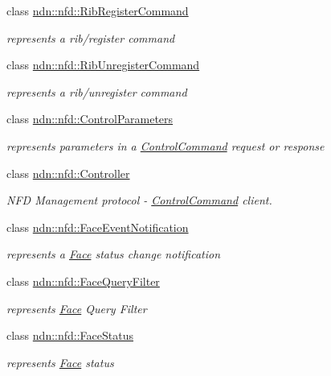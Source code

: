 \begin{DoxyCompactItemize}
class \hyperlink{classndn_1_1nfd_1_1RibRegisterCommand}{ndn\+::nfd\+::\+Rib\+Register\+Command}
\begin{DoxyCompactList}\small\item\em represents a rib/register command \end{DoxyCompactList}\item 
class \hyperlink{classndn_1_1nfd_1_1RibUnregisterCommand}{ndn\+::nfd\+::\+Rib\+Unregister\+Command}
\begin{DoxyCompactList}\small\item\em represents a rib/unregister command \end{DoxyCompactList}\item 
class \hyperlink{classndn_1_1nfd_1_1ControlParameters}{ndn\+::nfd\+::\+Control\+Parameters}
\begin{DoxyCompactList}\small\item\em represents parameters in a \hyperlink{classndn_1_1nfd_1_1ControlCommand}{Control\+Command} request or response \end{DoxyCompactList}\item 
class \hyperlink{classndn_1_1nfd_1_1Controller}{ndn\+::nfd\+::\+Controller}
\begin{DoxyCompactList}\small\item\em N\+FD Management protocol -\/ \hyperlink{classndn_1_1nfd_1_1ControlCommand}{Control\+Command} client. \end{DoxyCompactList}\item 
class \hyperlink{classndn_1_1nfd_1_1FaceEventNotification}{ndn\+::nfd\+::\+Face\+Event\+Notification}
\begin{DoxyCompactList}\small\item\em represents a \hyperlink{classndn_1_1Face}{Face} status change notification \end{DoxyCompactList}\item 
class \hyperlink{classndn_1_1nfd_1_1FaceQueryFilter}{ndn\+::nfd\+::\+Face\+Query\+Filter}
\begin{DoxyCompactList}\small\item\em represents \hyperlink{classndn_1_1Face}{Face} Query Filter \end{DoxyCompactList}\item 
class \hyperlink{classndn_1_1nfd_1_1FaceStatus}{ndn\+::nfd\+::\+Face\+Status}
\begin{DoxyCompactList}\small\item\em represents \hyperlink{classndn_1_1Face}{Face} status \end{DoxyCompactList}\item 

\end{DoxyCompactItemize}
